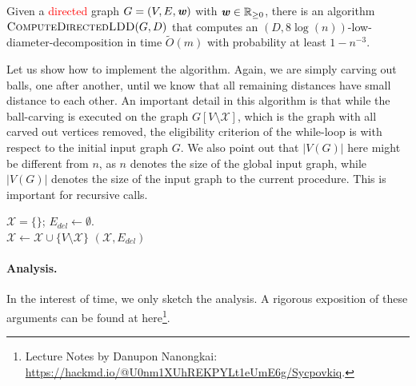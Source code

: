 \begin{theorem}\label{thm:computeDirLDDguarantees}
Given a \textcolor{red}{directed} graph $G = (V,E,\boldsymbol{\mathit{w}})$ with $\boldsymbol{\mathit{w}} \in \mathbb{R}_{\geq 0}$, there is an algorithm $\textsc{ComputeDirectedLDD}(G, D)$ that computes an $(D, 8 \log(n))$-low-diameter-decomposition in time $\tilde{O}(m)$ with probability at least $1-n^{-3}$. 
\end{theorem}

Let us show how to implement the algorithm. Again, we are simply carving out balls, one after another, until we know that all remaining distances have small distance to each other. An important detail in this algorithm is that while the ball-carving is executed on the graph $G[V \setminus \mathcal{X}]$, which is the graph with all carved out vertices removed, the eligibility criterion of the while-loop is with respect to the initial input graph $G$. We also point out that $|V(G)|$ here might be different from $n$, as $n$ denotes the size of the global input graph, while $|V(G)|$ denotes the size of the input graph to the current procedure. This is important for recursive calls.

\begin{algorithm}
$\mathcal{X} = \{\}$;  $E_{del} \gets \emptyset$.\\
$\mathcal{X} \gets \mathcal{X} \cup \{ V \setminus \mathcal{X}\}$\label{lne:addCluster} 
\Return $(\mathcal{X}, E_{del})$
\caption{$\textsc{ComputeDirectedLDD}(G, D)$}
\label{alg:directedLDD}
\end{algorithm}

\paragraph{Analysis.} In the interest of time, we only sketch the analysis. A rigorous exposition of these arguments can be found at here\footnote{Lecture Notes by Danupon Nanongkai: \url{https://hackmd.io/@U0nm1XUhREKPYLt1eUmE6g/Sycpovkiq}.}.

